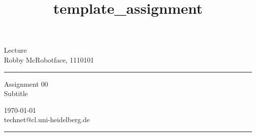 \documentclass[a4paper,10pt]{article} %
\begin{document}

\title{template_assignment} %
\fancyhead[C]{}
\begin{minipage}{0.295\textwidth} %
\raggedright
Lecture\\ %
\footnotesize %
Robby McRobotface, 1110101 %
\medskip\hrule
\end{minipage}
\begin{minipage}{0.4\textwidth} %
\centering 
\large %
Assignment 00\\ %
\normalsize %
Subtitle\\ %
\end{minipage}
\begin{minipage}{0.295\textwidth} %
\raggedleft
\today\\ %
\footnotesize %
technet@cl.uni-heidelberg.de%
\medskip\hrule
\end{minipage}



\bigskip


\printbibliography

\end{document}
